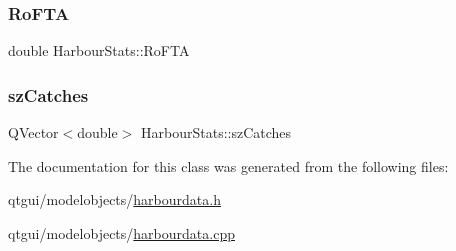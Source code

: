 \subsubsection{\texorpdfstring{RoFTA}{RoFTA}}
{\footnotesize\ttfamily double Harbour\+Stats\+::\+Ro\+F\+TA}

\mbox{\label{class_harbour_stats_a7e13b0dd63ad9bb61fd428dfac8111f5}} 
\subsubsection{\texorpdfstring{szCatches}{szCatches}}
{\footnotesize\ttfamily Q\+Vector$<$double$>$ Harbour\+Stats\+::sz\+Catches}



The documentation for this class was generated from the following files\+:\begin{DoxyCompactItemize}
\item 
qtgui/modelobjects/\mbox{\hyperlink{harbourdata_8h}{harbourdata.\+h}}\item 
qtgui/modelobjects/\mbox{\hyperlink{harbourdata_8cpp}{harbourdata.\+cpp}}\end{DoxyCompactItemize}
